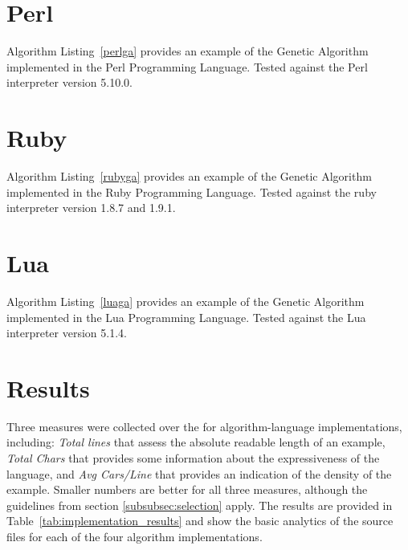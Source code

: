 \documentclass[a4paper, 11pt]{article}
\begin{document}
% 
% 
\section{Perl}
\label{sec:perl}
Algorithm Listing~\ref{perlga} provides an example of the Genetic Algorithm implemented in the Perl Programming Language. Tested against the Perl interpreter version 5.10.0.


% 
% 
\section{Ruby}
\label{sec:ruby}
Algorithm Listing~\ref{rubyga} provides an example of the Genetic Algorithm implemented in the Ruby Programming Language. Tested against the ruby interpreter version 1.8.7 and 1.9.1.


% 
% 
\section{Lua}
\label{sec:lua}
Algorithm Listing~\ref{luaga} provides an example of the Genetic Algorithm implemented in the Lua Programming Language. Tested against the Lua interpreter version 5.1.4.


% 
% 
\section{Results}
\label{sec:results}
Three measures were collected over the for algorithm-language implementations, including: \emph{Total lines} that assess the absolute readable length of an example, \emph{Total Chars} that provides some information about the expressiveness of the language, and \emph{Avg Cars/Line} that provides an indication of the density of the example. Smaller numbers are better for all three measures, although the guidelines from section \ref{subsubsec:selection} apply.
The results are provided in Table~\ref{tab:implementation_results} and show the basic analytics of the source files for each of the four algorithm implementations.
\end{document}
